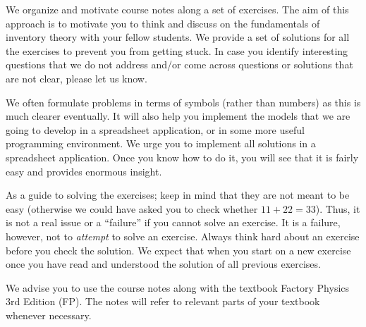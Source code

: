 
We organize and motivate course notes along a set of exercises. The aim of this approach is to motivate you to think and discuss on the fundamentals of inventory theory with your fellow students. We provide a set of solutions for all the exercises to prevent you from getting stuck. In case you identify interesting questions that we do not address and/or come across questions or solutions that are not clear, please let us know. 

We often formulate problems in terms of symbols (rather than numbers) as this is much clearer eventually. It will also help you implement the models that we are going to develop in a spreadsheet application, or in some more useful programming environment. We urge you to implement all solutions in a spreadsheet application. Once you know how to do it, you will see that it is fairly easy and provides enormous insight.

As a guide to solving the exercises; keep in mind that they are not meant to be easy (otherwise we could have asked you to check whether $11+22=33$). Thus, it is not a real issue or a ``failure'' if you cannot solve an exercise. It is a failure, however, not to \emph{attempt} to solve an exercise. Always think hard about an exercise before you check the solution. We expect that when you start on a new exercise once you have read and understood the solution of all previous exercises. 

We advise you to use the course notes along with the textbook Factory Physics 3rd Edition (FP). The notes will refer to relevant parts of your textbook whenever necessary. 
